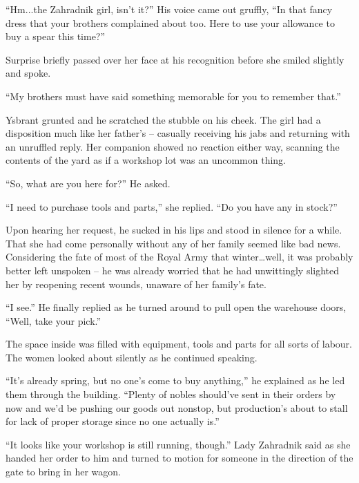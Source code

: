“Hm...the Zahradnik girl, isn’t it?” His voice came out gruffly, “In that fancy dress that your brothers complained about too. Here to use your allowance to buy a spear this time?”

 

Surprise briefly passed over her face at his recognition before she smiled slightly and spoke.

 

“My brothers must have said something memorable for you to remember that.”

 

Ysbrant grunted and he scratched the stubble on his cheek. The girl had a disposition much like her father’s – casually receiving his jabs and returning with an unruffled reply. Her companion showed no reaction either way, scanning the contents of the yard as if a workshop lot was an uncommon thing.

 

“So, what are you here for?” He asked.

 

“I need to purchase tools and parts,” she replied. “Do you have any in stock?”

 

Upon hearing her request, he sucked in his lips and stood in silence for a while. That she had come personally without any of her family seemed like bad news. Considering the fate of most of the Royal Army that winter…well, it was probably better left unspoken – he was already worried that he had unwittingly slighted her by reopening recent wounds, unaware of her family’s fate.

 

“I see.” He finally replied as he turned around to pull open the warehouse doors, “Well, take your pick.”

 

The space inside was filled with equipment, tools and parts for all sorts of labour. The women looked about silently as he continued speaking.

 

“It’s already spring, but no one’s come to buy anything,” he explained as he led them through the building. “Plenty of nobles should’ve sent in their orders by now and we’d be pushing our goods out nonstop, but production’s about to stall for lack of proper storage since no one actually is.”

 

“It looks like your workshop is still running, though.” Lady Zahradnik said as she handed her order to him and turned to motion for someone in the direction of the gate to bring in her wagon.

